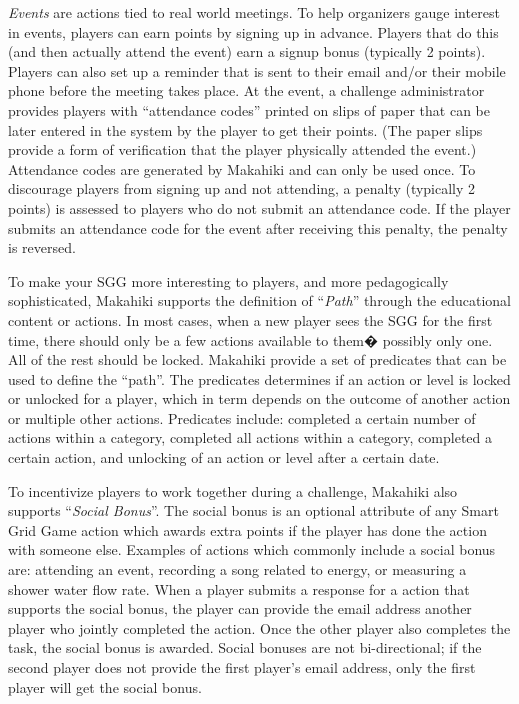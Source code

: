 {\em Events} are actions tied to real world meetings. To help organizers gauge interest in events, players can earn points by signing up in advance. Players that do this (and then actually attend the event) earn a signup bonus (typically 2 points). Players can also set up a reminder that is sent to their email and/or their mobile phone before the meeting takes place. At the event, a challenge administrator provides players with ``attendance codes'' printed on slips of paper that can be later entered in the system by the player to get their points. (The paper slips provide a form of verification that the player physically attended the event.) Attendance codes are generated by Makahiki and can only be used once. To discourage players from signing up and not attending, a penalty (typically 2 points) is assessed to players who do not submit an attendance code. If the player submits an attendance code for the event after receiving this penalty, the penalty is reversed. 

To make your SGG more interesting to players, and more pedagogically sophisticated, Makahiki supports the definition of ``{\em Path}'' through the educational content or actions. In most cases, when a new player sees the SGG for the first time, there should only be a few actions available to them� possibly only one. All of the rest should be locked. Makahiki provide a set of predicates that can be used to define the ``path''. The predicates  determines if an action or level is locked or unlocked for a player, which in term depends on the outcome of another action or multiple other actions. Predicates include: completed a certain number of actions within a category, completed all actions within a category, completed  a certain action, and unlocking of an action or level after a certain date.

To incentivize players to work together during a challenge, Makahiki also supports ``{\em Social Bonus}''. The social bonus is an optional attribute of any Smart Grid Game action which awards extra points if the player has done the action with someone else. Examples of actions which commonly include a social bonus are: attending an event, recording a song related to energy, or measuring a shower water flow rate. When a player submits a response for a action that supports the social bonus, the player can provide the email address another player who jointly completed the action. Once the other player also completes the task, the social bonus is awarded. Social bonuses are not bi-directional; if the second player does not provide the first player's email address, only the first player will get the social bonus.

